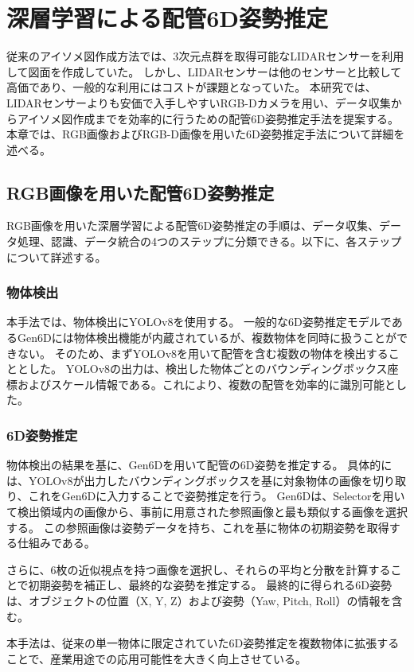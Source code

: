 \chapter{深層学習による配管6D姿勢推定}

従来のアイソメ図作成方法では、3次元点群を取得可能なLIDARセンサーを利用して図面を作成していた。
しかし、LIDARセンサーは他のセンサーと比較して高価であり、一般的な利用にはコストが課題となっていた。
本研究では、LIDARセンサーよりも安価で入手しやすいRGB-Dカメラを用い、データ収集からアイソメ図作成までを効率的に行うための配管6D姿勢推定手法を提案する。
本章では、RGB画像およびRGB-D画像を用いた6D姿勢推定手法について詳細を述べる。

\section{RGB画像を用いた配管6D姿勢推定} 
RGB画像を用いた深層学習による配管6D姿勢推定の手順は、データ収集、データ処理、認識、データ統合の4つのステップに分類できる。以下に、各ステップについて詳述する。

\subsection{物体検出}
本手法では、物体検出にYOLOv8を使用する。
一般的な6D姿勢推定モデルであるGen6Dには物体検出機能が内蔵されているが、複数物体を同時に扱うことができない。
そのため、まずYOLOv8を用いて配管を含む複数の物体を検出することとした。
YOLOv8の出力は、検出した物体ごとのバウンディングボックス座標およびスケール情報である。これにより、複数の配管を効率的に識別可能とした。

\subsection{6D姿勢推定}
物体検出の結果を基に、Gen6Dを用いて配管の6D姿勢を推定する。
具体的には、YOLOv8が出力したバウンディングボックスを基に対象物体の画像を切り取り、これをGen6Dに入力することで姿勢推定を行う。
Gen6Dは、Selectorを用いて検出領域内の画像から、事前に用意された参照画像と最も類似する画像を選択する。
この参照画像は姿勢データを持ち、これを基に物体の初期姿勢を取得する仕組みである。

さらに、6枚の近似視点を持つ画像を選択し、それらの平均と分散を計算することで初期姿勢を補正し、最終的な姿勢を推定する。
最終的に得られる6D姿勢は、オブジェクトの位置（X, Y, Z）および姿勢（Yaw, Pitch, Roll）の情報を含む。

本手法は、従来の単一物体に限定されていた6D姿勢推定を複数物体に拡張することで、産業用途での応用可能性を大きく向上させている。


